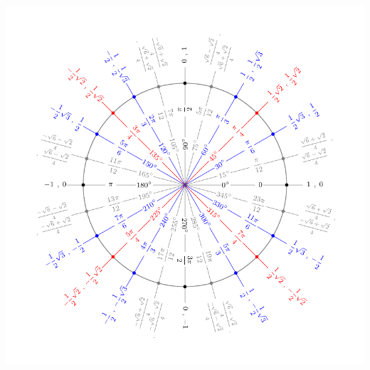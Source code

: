 \begin{minipage}{\linewidth}
  \centering
  \includegraphics[width=\linewidth]{content/figures/einheitskreis_15}
\end{minipage}
